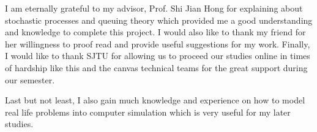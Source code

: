 I am eternally grateful to my advisor, Prof. Shi Jian Hong for explaining about stochastic processes and queuing theory which provided me a good understanding and knowledge to complete this project. I would also like to thank my friend for her willingness to proof read and provide useful suggestions for my work. Finally, I would like to thank SJTU for allowing us to proceed our studies online in times of hardship like this and the canvas technical teams for the great support during our semester.

Last but not least, I also gain much knowledge and experience on how to model real life problems into computer simulation which is very useful for my later studies.